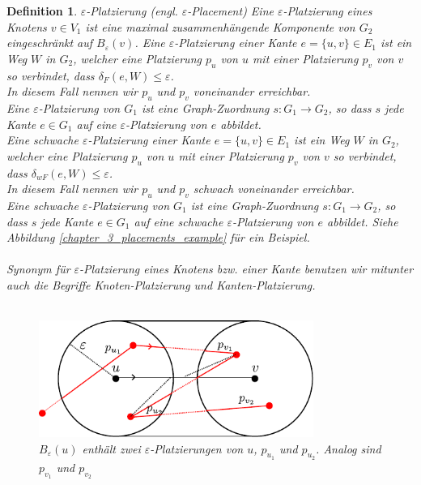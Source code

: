 \documentclass[a4paper, 12pt, twoside]{article}
\theoremstyle{Format1} %
\newtheorem{Def}{Definition}[section]       %
\begin{document}
\begin{Def}
	$\varepsilon$-Platzierung (engl. $\varepsilon$-Placement)
	Eine \textit{$\varepsilon$-Platzierung eines Knotens $v \in V_1$} ist eine maximal zusammenhängende Komponente von $G_2$ eingeschränkt auf $B_{\varepsilon}(v)$.
	Eine \textit{$\varepsilon$-Platzierung einer Kante $e = \{u,v\} \in E_1$} ist ein Weg $W$ in $G_2$, welcher eine Platzierung $p_u$ von $u$ mit einer Platzierung $p_v$ von $v$
	so verbindet, dass $\delta_F(e, W) \leq \varepsilon$.
	\\
	In diesem Fall nennen wir $p_u$ und $p_v$ \textit{voneinander erreichbar}.
	\\
	Eine \textit{$\varepsilon$-Platzierung von $G_1$} ist eine Graph-Zuordnung $s: G_1 \to G_2$, so dass $s$ jede Kante $e \in G_1$ auf eine $\varepsilon$-Platzierung von $e$ abbildet.
	\\
	Eine schwache $\varepsilon$-Platzierung einer Kante $e = \{u,v\} \in E_1$ ist ein Weg $W$ in $G_2$, welcher eine Platzierung $p_u$ von $u$ mit einer Platzierung $p_v$ von $v$
	so verbindet, dass $\delta_{wF}(e, W) \leq \varepsilon$.
	\\
	In diesem Fall nennen wir $p_u$ und $p_v$ \textit{schwach voneinander erreichbar}.
	\\
	Eine schwache \textit{$\varepsilon$-Platzierung von $G_1$} ist eine Graph-Zuordnung $s: G_1 \to G_2$, so dass $s$ jede Kante $e \in G_1$ auf eine schwache $\varepsilon$-Platzierung von $e$ abbildet.
	Siehe Abbildung \ref{chapter_3_placements_example} für ein Beispiel.
	\\
	\\
	Synonym für $\varepsilon$-Platzierung eines Knotens bzw. einer Kante benutzen wir mitunter auch die Begriffe \textit{Knoten-Platzierung} und \textit{Kanten-Platzierung}.
	\\
	\\
	\begin{figure}[htpb]
	    \centering
	    \includegraphics[width=0.8\textwidth]{chapter_3_placements_example.pdf}
		\caption{$B_{\varepsilon}(u)$ enthält zwei $\varepsilon$-Platzierungen von $u$, $p_{u_1}$ und $p_{u_2}$. Analog sind $p_{v_1}$ und $p_{v_2}$
}
\end{figure}
\end{Def}
\end{document}
